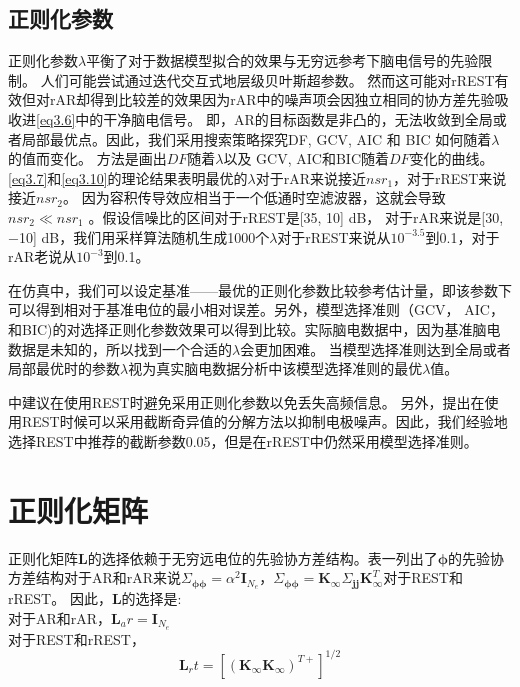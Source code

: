 \subsection{正则化参数}
正则化参数$\lambda$平衡了对于数据模型拟合的效果与无穷远参考下脑电信号的先验限制。 
人们可能尝试通过迭代交互式地层级贝叶斯超参数。 然而这可能对rREST有效但对rAR却得到比较差的效果因为rAR中的噪声项会因独立相同的协方差先验吸收进\eqref{eq3.6}中的干净脑电信号。 即，AR的目标函数是非凸的，无法收敛到全局或者局部最优点。因此，我们采用搜索策略探究DF, GCV, AIC 和
BIC 如何随着$\lambda$的值而变化。 方法是画出$DF$随着$\lambda$以及 GCV, AIC和BIC随着$DF$变化的曲线。\eqref{eq3.7}和\eqref{eq3.10}的理论结果表明最优的$\lambda$对于rAR来说接近$nsr_1$，对于rREST来说接近$nsr_2$。 因为容积传导效应相当于一个低通时空滤波器，这就会导致$nsr_2 ≪ nsr_1$
。假设信噪比的区间对于rREST是[35, 10] dB， 对于rAR来说是[30, −10] dB，我们用采样算法随机生成1000个$\lambda$对于rREST来说从$10^{-3.5}$到0.1，对于rAR老说从$10^{-3}$到0.1。

在仿真中，我们可以设定基准——最优的正则化参数比较参考估计量，即该参数下可以得到相对于基准电位的最小相对误差。另外，模型选择准则（GCV，
AIC，和BIC)的对选择正则化参数效果可以得到比较。实际脑电数据中，因为基准脑电数据是未知的，所以找到一个合适的$\lambda$会更加困难。 当模型选择准则达到全局或者局部最优时的参数$\lambda$视为真实脑电数据分析中该模型选择准则的最优$\lambda$值。

\cite{yao_method_2001}中建议在使用REST时避免采用正则化参数以免丢失高频信息。 另外，\cite{zhai_y_and_yao_d_study_2004}提出在使用REST时候可以采用截断奇异值的分解方法以抑制电极噪声。因此，我们经验地选择REST中推荐的截断参数0.05，但是在rREST中仍然采用模型选择准则。
\section{正则化矩阵}
正则化矩阵$\mathbf{L}$的选择依赖于无穷远电位的先验协方差结构。表一列出了$\mathbf{\phi}$的先验协方差结构对于AR和rAR来说$\Sigma_{\mathbf{\phi\phi}}=\alpha^{2}\mathbf{I}_{N_e}$，$\Sigma_{\mathbf{\phi\phi}}=\mathbf{K}_{\infty}\Sigma_{\mathbf{jj}}\mathbf{K}_{\infty}^T$对于REST和rREST。 因此，$\mathbf{L}$的选择是:\\
对于AR和rAR，$\mathbf{L}_ar=\mathbf{I}_{N_e}$\\
对于REST和rREST，
\begin{equation}\label{eq3.17}
\mathbf{L}_rt=[(\mathbf{K}_{\infty}\mathbf{K}_{\infty})^{T+}]^{1/2}
\end{equation}

